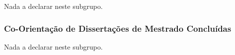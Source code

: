 \documentclass[a4paper,oneside,10pt]{article}
\begin{document}
Nada a declarar neste subgrupo.
%
%
%


\subsubsection{Co-Orienta\c{c}\~{a}o de Disserta\c{c}\~{o}es de Mestrado Conclu\'{i}das}
\vspace{0.3cm}

Nada a declarar neste subgrupo.
%
%
%
%
\end{document}
